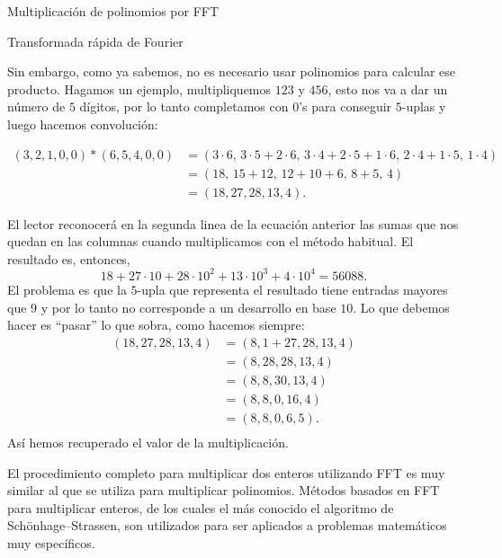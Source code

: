 \begin{chapter}{Multiplicación de polinomios por FFT}
\begin{section}{Transformada rápida de Fourier}
\begin{ejemplo*}
      Sin embargo, como ya sabemos, no es necesario usar polinomios para calcular ese producto. Hagamos un ejemplo, multipliquemos $123$ y $456$, esto nos va a dar un número de $5$ dígitos, por lo tanto completamos con $0$'s para conseguir $5$-uplas y luego hacemos convolución:
      \begin{small}
          \begin{align*}
              (3,2,1,0,0)*(6,5,4,0,0) & = (3\cdot 6,\, 3\cdot  5 + 2\cdot 6 ,\, 3\cdot 4 +  2\cdot 5+ 1\cdot 6,\, 2\cdot 4 + 1 \cdot 5,\,1 \cdot 4) \\
                                      & = (18,\, 15 + 12,\, 12 +10 +6,\, 8 +5,\, 4)                                                                 \\
                                      & = (18, 27, 28, 13, 4).
          \end{align*}
      \end{small}
      El lector reconocerá en la segunda linea de la ecuación anterior las sumas que nos quedan en las columnas cuando multiplicamos con el método habitual. El resultado es, entonces,
      \begin{equation*}
          18+ 27 \cdot 10 + 28 \cdot 10^2 +  13\cdot 10^3 + 4 \cdot 10^4 = 56088.
      \end{equation*}
      El problema es que la $5$-upla que representa el resultado tiene entradas mayores que $9$ y por lo tanto no corresponde a un desarrollo en base $10$. Lo  que debemos hacer es ``pasar'' lo que sobra, como hacemos siempre:
      \begin{align*}
          (18, 27, 28, 13, 4) & = (8,1 + 27, 28, 13, 4) \\
                              & = (8,28, 28, 13, 4)     \\
                              & = (8,8, 30, 13, 4)      \\
                              & = (8,8, 0, 16, 4)       \\
                              & = (8,8, 0, 6, 5).       \\
      \end{align*}
      Así hemos recuperado el valor de la multiplicación.

      El procedimiento completo para multiplicar dos enteros utilizando FFT es muy similar al que se utiliza para multiplicar polinomios. Métodos basados en FFT para multiplicar enteros, de los cuales el más conocido el algoritmo de Schönhage–Strassen, son utilizados para ser aplicados a problemas matemáticos muy específicos.

  \end{ejemplo*}



 \end{section}


\end{chapter}

